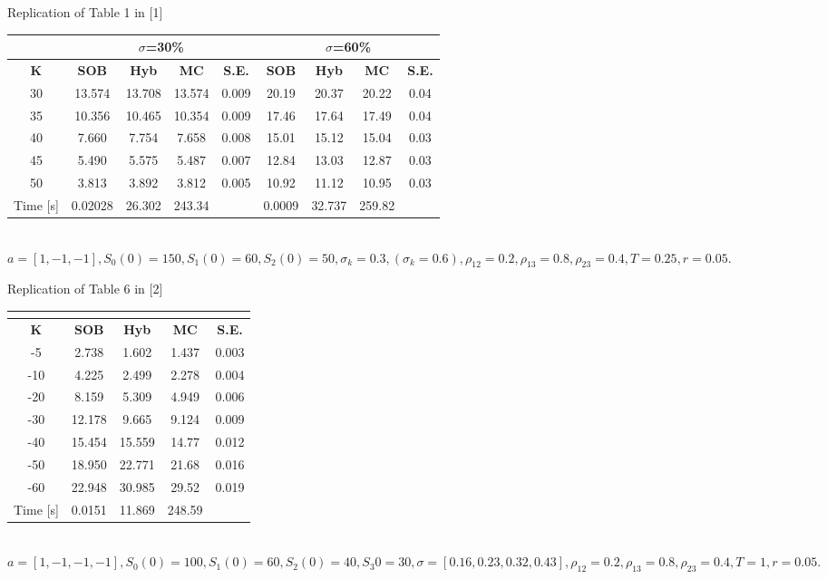 \documentclass[a4paper]{article}
\begin{document}
\captionsetup{skip=0pt}
\begin {table}[H]
\caption {Replication of Table 1 in [1]} 
\begin{center}
\begin{tabular}{c|c c c c|c c c c}
\hline
\multicolumn{1}{c|}{} & \multicolumn{4}{|c|}{$\sigma$=30\%} & \multicolumn{4}{|c}{$\sigma$=60\%} \\ 
\hline
  \textbf{K} & \textbf{SOB} & \textbf{Hyb}	& \textbf{MC} & \textbf{S.E.} & \textbf{SOB} & \textbf{Hyb} & \textbf{MC} & \textbf{S.E.}\\
  30 &	13.574 & 13.708 & 13.574 & 0.009 &  20.19 & 20.37  & 20.22 & 0.04 \\
  35 & 10.356 & 10.465 & 10.354 & 0.009 & 17.46  & 17.64 &17.49 & 0.04  \\
 40 & 7.660 & 7.754 & 7.658 & 0.008 & 15.01  & 15.12  & 15.04 & 0.03  \\
 45 & 5.490 & 5.575 & 5.487  & 0.007 & 12.84  &13.03  &12.87  & 0.03\\
 50 & 3.813 & 3.892 & 3.812  & 0.005 & 10.92  & 11.12 &10.95  &0.03 \\
\hline
Time [s] & 0.02028 & 26.302 & 243.34 & & 0.0009&  32.737 & 259.82 & \\
\hline
\end{tabular}
\\[8pt]
\caption*{$a=[1,-1,-1], S_0(0)=150, S_1(0) = 60, S_2(0) = 50, \sigma_k = 0.3, (\sigma_k = 0.6),\rho_{12} = 0.2, \rho_{13} = 0.8, \rho_{23} = 0.4, T = 0.25, r=0.05.$}
\end{center}
\end{table}

\begin {table}[H]
\caption {Replication of Table 6 in [2]} 
\begin{center}
\begin{tabular}{c|c c c c}
\hline
\multicolumn{1}{c|}{} & \multicolumn{4}{|c}{} \\ 
\hline
  \textbf{K} & \textbf{SOB} & \textbf{Hyb} & \textbf{MC} & \textbf{S.E.}\\
  -5 & 2.738	& 1.602	& 1.437    &  0.003\\
-10 & 4.225	& 2.499	& 2.278    & 0.004\\
-20 & 8.159	& 5.309	& 4.949    & 0.006\\
-30 & 12.178	& 9.665	& 9.124& 0.009\\
-40 & 15.454	& 15.559	& 14.77 & 0.012\\
-50 & 18.950	& 22.771	& 21.68 & 0.016\\
-60 & 22.948	& 30.985	& 29.52 & 0.019\\
\hline
Time [s] & 0.0151 & 11.869 & 248.59 & \\
\hline
\end{tabular}
\\[8pt]
\caption*{$a=[1,-1,-1, -1], S_0(0)=100, S_1(0) = 60, S_2(0) = 40, S_3{0} = 30, \sigma = [0.16, 0.23, 0.32, 0.43], \rho_{12} = 0.2, \rho_{13} = 0.8, \rho_{23} = 0.4, T = 1, r=0.05.$}
\end{center}
\end{table}
\end{document}

